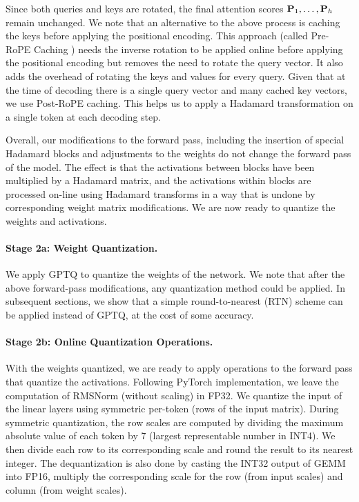 Since both queries and keys are rotated, the final attention scores ${\mathbf{P}}_1, \ldots, {\mathbf{P}}_h$ remain unchanged. We note that an alternative to the above process is caching the keys before applying the positional encoding. This approach (called Pre-RoPE Caching \citep{kvquant}) needs the inverse rotation to be applied online before applying the positional encoding but removes the need to rotate the query vector. It also adds the overhead of rotating the keys and values for every query. Given that at the time of decoding there is a single query vector and many cached key vectors, we use Post-RoPE caching. This helps us to apply a Hadamard transformation on a single token at each decoding step.

Overall, our modifications to the forward pass, including the insertion of special Hadamard blocks and adjustments to the weights do not change the forward pass of the model. The effect is that the activations between blocks have been multiplied by a Hadamard matrix, and the activations within blocks are processed on-line using Hadamard transforms in a way that is undone by corresponding weight matrix modifications. We are now ready to quantize the weights and activations. 

\paragraph{Stage 2a: Weight Quantization.}
We apply GPTQ \citep{gptq} to quantize the weights of the network. We note that after the above forward-pass modifications, any quantization method could be applied. In subsequent sections, we show that a simple round-to-nearest (RTN) scheme can be applied instead of GPTQ, at the cost of some accuracy. 

\paragraph{Stage 2b: Online Quantization Operations.}
With the weights quantized, we are ready to apply operations to the forward pass that quantize the activations. Following PyTorch implementation, we leave the computation of RMSNorm (without scaling) in FP32. We quantize the input of the linear layers using symmetric per-token (rows of the input matrix). During symmetric quantization, the row scales are computed by dividing the maximum absolute value of each token by 7 (largest representable number in INT4). We then divide each row to its corresponding scale and round the result to its nearest integer. The dequantization is also done by casting the INT32 output of GEMM into FP16, multiply the corresponding scale for the row (from input scales) and column (from weight scales).


